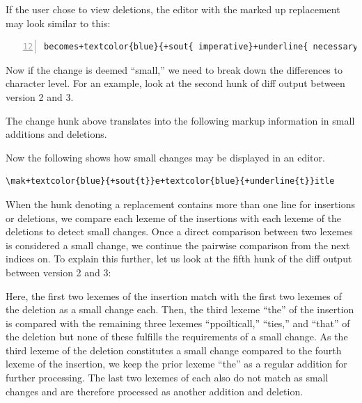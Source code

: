 If the user chose to view deletions, the editor with the marked up replacement may look similar to this:

\begin{Verbatim}[frame=lines,label={Markup of whole word change blocks},numbers=left,firstnumber=12,showspaces=true,commandchars=+\{\}]
becomes+textcolor{blue}{+sout{ imperative}+underline{ necessary }}for
\end{Verbatim}

Now if the change is deemed ``small,'' we need to break down the differences to character level.  For an example, look at the second hunk of diff output between version 2 and 3.


The change hunk above translates into the following markup information in small additions and deletions.  


Now the following shows how small changes may be displayed in an editor.  

\begin{Verbatim}[frame=lines,label={Markup of a small change},samepage=true,showspaces=true,commandchars=+\{\}]
\mak+textcolor{blue}{+sout{t}}e+textcolor{blue}{+underline{t}}itle
\end{Verbatim}

When the hunk denoting a replacement contains more than one line for insertions or deletions, we compare each lexeme of the insertions with each lexeme of the deletions to detect small changes.  Once a direct comparison between two lexemes is considered a small change, we continue the pairwise comparison from the next indices on.  To explain this further, let us look at the fifth hunk of the diff output between version 2 and 3:


Here, the first two lexemes of the insertion match with the first two lexemes of the deletion as a small change each.  Then, the third lexeme ``the'' of the insertion is compared with the remaining three lexemes ``ppoilticall,'' ``ties,'' and ``that'' of the deletion but none of these fulfills the requirements of a small change.  As the third lexeme of the deletion constitutes a small change compared to the fourth lexeme of the insertion, we keep the prior lexeme ``the'' as a regular addition for further processing.  The last two lexemes of each also do not match as small changes and are therefore processed as another addition and deletion.

